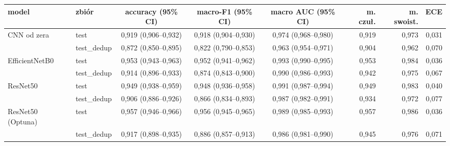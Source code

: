 \begin{tabular}{llcccrrr}
\toprule
model & zbiór & accuracy (95\% CI) & macro-F1 (95\% CI) & macro AUC (95\% CI) & m. czuł. & m. swoist. & ECE \\
\midrule
CNN od zera & test & 0,919 (0,906--0,932) & 0,918 (0,904--0,930) & 0,974 (0,968--0,980) & 0,919 & 0,973 & 0,031 \\
 & test\_dedup & 0,872 (0,850--0,895) & 0,822 (0,790--0,853) & 0,963 (0,954--0,971) & 0,904 & 0,962 & 0,070 \\
EfficientNetB0 & test & 0,953 (0,943--0,963) & 0,952 (0,941--0,962) & 0,993 (0,990--0,995) & 0,953 & 0,984 & 0,036 \\
 & test\_dedup & 0,914 (0,896--0,933) & 0,874 (0,843--0,900) & 0,990 (0,986--0,993) & 0,942 & 0,975 & 0,067 \\
ResNet50 & test & 0,949 (0,938--0,959) & 0,948 (0,936--0,958) & 0,991 (0,987--0,994) & 0,949 & 0,983 & 0,040 \\
 & test\_dedup & 0,906 (0,886--0,926) & 0,866 (0,834--0,893) & 0,987 (0,982--0,991) & 0,934 & 0,972 & 0,077 \\
ResNet50 (Optuna) & test & 0,957 (0,946--0,966) & 0,956 (0,945--0,965) & 0,989 (0,985--0,993) & 0,957 & 0,986 & 0,036 \\
 & test\_dedup & 0,917 (0,898--0,935) & 0,886 (0,857--0,913) & 0,986 (0,981--0,990) & 0,945 & 0,976 & 0,071 \\
\bottomrule
\end{tabular}
